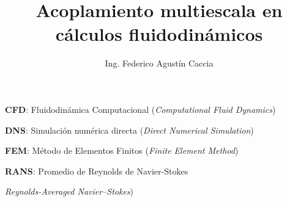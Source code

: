 \documentclass[12pt,screen,twoside,pagebackref]{ibtesis}
\title{Acoplamiento multiescala en cálculos fluidodinámicos}
\author{Ing. Federico Agustín Caccia}
\begin{document}
\renewcommand{\tablename}{Tabla} %


\begin{preliminary}



\begin{abreviaturas} %

\textbf{CFD}: Fluidodinámica Computacional (\textit{Computational Fluid Dynamics})

\textbf{DNS}: Simulación numérica directa (\textit{Direct Numerical Simulation})

\textbf{FEM}: Método de Elementos Finitos (\textit{Finite Element Method})

\textbf{RANS}: Promedio de Reynolds de Navier-Stokes

\textit{Reynolds-Averaged Navier–Stokes})

\end{abreviaturas}

\tableofcontents                %

\listoffigures                  %

\listoftables                   %



\end{preliminary}




\appendix



\begin{biblio}

\end{biblio}
\end{document}
